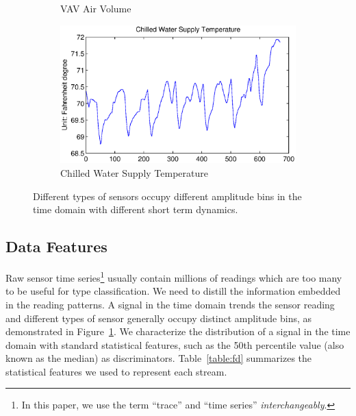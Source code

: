 \begin{figure}[ht!]
\begin{subfigure}{0.32\textwidth}
                \caption{VAV Air Volume}
  \end{subfigure}
  \begin{subfigure}{0.32\textwidth}
                \centering
    \includegraphics[width=\textwidth]{./fig/cwt.eps}
                \caption{Chilled Water Supply Temperature}
  \end{subfigure}
\caption{Different types of sensors occupy different amplitude bins in the time domain with different short term dynamics.}
\label{fig:example}
\end{figure}

\subsection{Data Features}
Raw sensor time series\footnote{In this paper, we use the term ``trace'' and ``time series'' \textit{interchangeably}.} usually contain millions of readings which are too many to be useful for type classification. We need to distill the information embedded in the reading patterns.
A signal in the time domain trends the sensor reading and different types of sensor generally occupy distinct amplitude bins, as demonstrated in Figure~\ref{fig:example}. 
We characterize the distribution of a signal in the time domain with standard statistical features, such as the 50th percentile value (also known as the median) as discriminators. 
Table~\ref{table:fd} summarizes the statistical features we used to represent each stream. 


